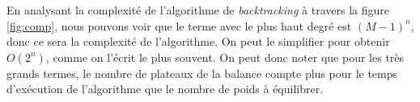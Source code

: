 \documentclass[12pt]{article} %
\begin{document}
\vfill

En analysant la complexité de l'algorithme de \textit{backtracking} à travers la figure \ref{fig:comp}, nous pouvons voir que le terme avec le plus haut degré est $(M-1)^n$, donc ce sera la complexité de l'algorithme. On peut le simplifier pour obtenir $O(2^n)$, comme on l'écrit le plus souvent. On peut donc noter que pour les très grands termes, le nombre de plateaux de la balance compte plus pour le temps d'exécution de l'algorithme que le nombre de poids à équilibrer. 












\end{document}
